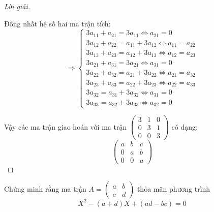 \documentclass[class=nhvh-linear-algebra,crop=false]{standalone}
\begin{document}
\begin{proof}[Lời giải]
\[    \]
    \par Đồng nhất hệ số hai ma trận tích:
    \[
        \Rightarrow
        \begin{cases}
            3a_{11} + a_{21} = 3a_{11} \Leftrightarrow a_{21} = 0               \\
            3a_{12} + a_{22} = a_{11} + 3a_{12} \Leftrightarrow a_{11} = a_{22} \\
            3a_{13} + a_{23} = a_{12} + 3a_{13} \Leftrightarrow a_{12} = a_{23} \\
            3a_{21} + a_{31} = 3a_{21} \Leftrightarrow a_{31} = 0               \\
            3a_{22} + a_{32} = a_{21} + 3a_{22} \Leftrightarrow a_{21} = a_{32} \\
            3a_{23} + a_{33} = a_{22} + 3a_{23} \Leftrightarrow a_{22} = a_{33} \\
            3a_{32} = a_{31} + 3a_{32} \Leftrightarrow a_{31} = 0               \\
            3a_{33} = a_{32} + 3a_{33} \Leftrightarrow a_{32} = 0
        \end{cases}
    \]
    \par Vậy các ma trận giao hoán với ma trận
    $\begin{pmatrix}
            3 & 1 & 0 \\
            0 & 3 & 1 \\
            0 & 0 & 3
        \end{pmatrix}$
    có dạng:
    \[
        \begin{pmatrix}
            a & b & c \\
            0 & a & b \\
            0 & 0 & a
        \end{pmatrix}
    \]
\end{proof}

\begin{exercise}\label{characteristic-poly}
    Chứng minh rằng ma trận
    $A = \begin{pmatrix}a & b \\ c & d\end{pmatrix}$ thỏa mãn phương trình
    \[
        X^{2} - (a+d)X + (ad-bc) = 0
    \]
\end{exercise}
\end{document}
